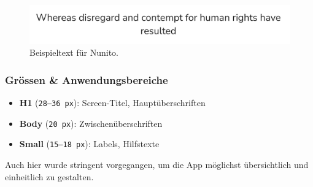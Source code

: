 \begin{figure}[h!]
	\centering
	\includegraphics[width=0.7\linewidth]{images/Font}
	\caption{Beispieltext für Nunito.}
	\label{fig:font}
\end{figure}

\subsubsection{Grössen \& Anwendungsbereiche}
\begin{itemize}
	\item \textbf{H1} (\texttt{28--36\,px}): Screen-Titel, Hauptüberschriften
	\item \textbf{Body} (\texttt{20\,px}): Zwischenüberschriften
	\item \textbf{Small} (\texttt{15--18\,px}): Labels, Hilfstexte
\end{itemize}
Auch hier wurde stringent vorgegangen, um die App möglichst übersichtlich und einheitlich zu gestalten.

\newpage
